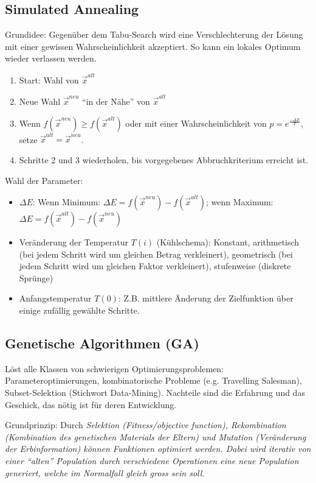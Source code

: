 \subsection{Simulated Annealing }
  Grundidee: Gegenüber dem Tabu-Search wird eine Verschlechterung der Lösung mit einer gewissen Wahrscheinlichkeit akzeptiert. So kann ein lokales Optimum wieder verlassen werden.
  
  \begin{enumerate}
    \item Start: Wahl von $\vec{x}^{alt}$
    \item Neue Wahl $\vec{x}^{neu}$ "`in der Nähe"' von $\vec{x}^{alt}$
    \item Wenn $f(\vec{x}^{neu}) \geq f(\vec{x}^{alt})$ oder mit einer Wahrscheinlichkeit von $p = e^{\frac{-\Delta E}{T}}$, setze $\vec{x}^{alt} = \vec{x}^{neu}$.
    \item Schritte 2 und 3 wiederholen, bis vorgegebenes Abbruchkriterium erreicht ist.
  \end{enumerate}
  
  Wahl der Parameter:
  \begin{itemize}
    \item $\Delta E$: Wenn Minimum: $\Delta E = f(\vec{x}^{neu}) - f(\vec{x}^{alt})$; wenn Maximum: $\Delta E = f(\vec{x}^{alt}) - f(\vec{x}^{neu})$
    \item Veränderung der Temperatur $T(i)$ (Kühlschema): Konstant, arithmetisch (bei jedem Schritt wird um gleichen Betrag verkleinert), geometrisch (bei jedem Schritt wird um gleichen Faktor verkleinert), stufenweise (diskrete Sprünge)
    \item Anfangstemperatur $T(0)$: Z.B. mittlere Änderung der Zielfunktion über einige zufällig gewählte Schritte.
  \end{itemize}
  

\subsection{Genetische Algorithmen (GA) }
  
    Löst alle Klassen von schwierigen Optimierungsproblemen: Parameteroptimierungen, kombinatorische Probleme (e.g. Travelling Salesman), Subset-Selektion (Stichwort Data-Mining). Nachteile sind die Erfahrung und das Geschick, das nötig ist für deren Entwicklung.
  
    Grundprinzip: Durch \em Selektion \em (Fitness/objective function), \em Rekombination \em (Kombination des genetischen Materials der Eltern) und \em Mutation \em (Veränderung der Erbinformation) können Funktionen optimiert werden. Dabei wird iterativ von einer "`alten"' Population durch verschiedene Operationen eine neue Population generiert, welche im Normalfall gleich gross sein soll.\\
    
